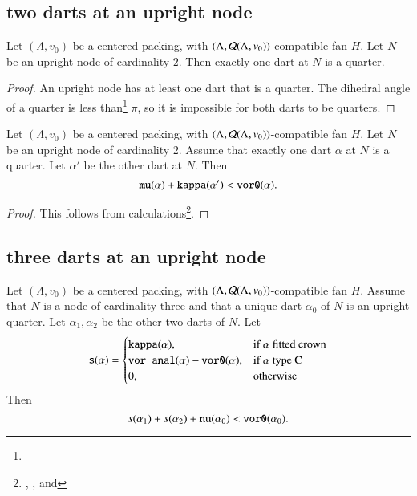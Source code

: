 \subsection{two darts at an upright node}


\begin{lemma}
Let $(\Lambda,v_0)$ be a centered packing, with $(\Lambda,{\mathcal Q}(\Lambda,v_0))$-compatible fan $H$. Let $N$ be an upright node
of cardinality $2$.  Then exactly one dart at $N$ is a quarter.
\end{lemma}

\begin{proof}
An upright node has at least one dart that is a quarter.
The dihedral angle of a quarter is
less than\footnote{} $\pi$, so it is
impossible for both darts to be quarters.
\end{proof}

\begin{lemma}\label{a:context11} %
Let $(\Lambda,v_0)$ be a centered packing, 
with $(\Lambda,{\mathcal Q}(\Lambda,v_0))$-compatible fan $H$.  
Let $N$ be an upright node
of cardinality $2$.  Assume that exactly one dart $\alpha$ 
at $N$ is a quarter.  Let $\alpha'$ be the other dart at $N$.
Then
 $$
 {\operatorname{{\texttt{mu}}}}(\alpha) + {\operatorname{{\texttt{kappa}}}}(\alpha') < {\operatorname{{\texttt{vor0}}}}(\alpha).
 $$
\end{lemma}

\begin{proof}
This follows from
calculations\footnote{, , and
}.
\end{proof}

\subsection{three darts at an upright node}


\begin{lemma}
Let $(\Lambda,v_0)$ be a centered packing, 
with $(\Lambda,{\mathcal Q}(\Lambda,v_0))$-compatible fan $H$.
Assume that $N$ is a node
of cardinality three and that a unique dart $\alpha_0$  of $N$
is an upright quarter.  Let $\alpha_1,\alpha_2$ be the other
two darts of $N$.
Let 
  $${\operatorname{{\texttt{s}}}}(\alpha)=\begin{cases}
  {\operatorname{{\texttt{kappa}}}}(\alpha),&\text{if $\alpha$ fitted crown}\\
  {\operatorname{{\texttt{vor\_anal}}}}(\alpha)-{\operatorname{{\texttt{vor0}}}}(\alpha),&\text{if $\alpha$ type C}\\
  0,&\text{otherwise}
  \end{cases}
  $$
Then 
  $$
  s(\alpha_1) + s(\alpha_2) + {\operatorname{{\texttt{nu}}}}(\alpha_0) < {\operatorname{{\texttt{vor0}}}}(\alpha_0).
  $$
\end{lemma}


